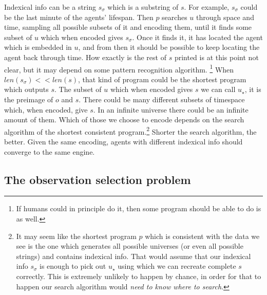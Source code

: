 \documentclass[oneside,hidelinks]{article}
\begin{document}
Indexical info can be a string $s_\sigma$ which is a substring of $s$.
For example, $s_\sigma$ could be the last minute of the agents' lifespan.
Then $p$ searches $u$ through space and time, sampling all possible subsets of it and encoding them, until it finds some subset of $u$ which when encoded gives $s_\sigma$.
Once it finds it, it has located the agent which is embedded in $u$, and from then it should be possible to keep locating the agent back through time.
How exactly is the rest of $s$ printed is at this point not clear, but it may depend on some pattern recognition algorithm.
\footnote{
If humans could in principle do it, then some program should be able to do is as well.
}
When $len(s_\sigma) << len(s)$, that kind of program could be the shortest program which outputs $s$.
The subset of $u$ which when encoded gives $s$ we can call $u_\star$, it is the preimage of $o$ and $s$.
There could be many different subsets of timespace which, when encoded, give $s$.
In an infinite universe there could be an infinite amount of them.
Which of those we choose to encode depends on the search algorithm of the shortest consistent program.\footnote{
It may seem like the shortest program $p$ which is consistent with the data we see is the one which generates all possible universes (or even all possible strings) and contains indexical info.
That would assume that our indexical info $s_\sigma$ is enough to pick out $u_\star$ using which we can recreate complete $s$ correctly.
This is extremely unlikely to happen by chance, in order for that to happen our search algorithm would \textit{need to know where to search}.
}
Shorter the search algorithm, the better.
Given the same encoding, agents with different indexical info should converge to the same engine.




\newpage

\subsection{The observation selection problem}
\end{document}
